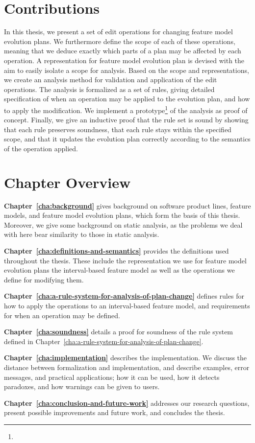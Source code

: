 \section{Contributions}

In this thesis, we present a set of edit operations for changing feature model evolution plans. We furthermore define the scope of each of these operations, meaning that we deduce exactly which parts of a plan may be affected by each operation. A representation for feature model evolution plan is devised with the aim to easily isolate a scope for analysis. Based on the scope and representations, we create an analysis method for validation and application of the edit operations. The analysis is formalized as a set of rules, giving detailed specification of when an operation may be applied to the evolution plan, and how to apply the modification. We implement a prototype\footnote{} of the analysis as proof of concept. Finally, we give an inductive proof that the rule set is sound by showing that each rule preserves soundness, that each rule stays within the specified scope, and that it updates the evolution plan correctly according to the semantics of the operation applied.

\section{Chapter Overview}
\label{sec:chapter-overview}

\textbf{Chapter~\ref{cha:background}} gives background on software product lines, feature models, and feature model evolution plans, which form the basis of this thesis. Moreover, we give some background on static analysis, as the problems we deal with here bear similarity to those in static analysis.

\textbf{Chapter~\ref{cha:definitions-and-semantics}} provides the definitions used throughout the thesis. These include the representation we use for feature model evolution plans \textemdash{} the interval-based feature model \textemdash{} as well as the operations we define for modifying them. 

\textbf{Chapter~\ref{cha:a-rule-system-for-analysis-of-plan-change}} defines rules for how to apply the operations to an interval-based feature model, and requirements for when an operation may be defined.

\textbf{Chapter~\ref{cha:soundness}} details a proof for soundness of the rule system defined in Chapter~\vref{cha:a-rule-system-for-analysis-of-plan-change}.

\textbf{Chapter~\ref{cha:implementation}} describes the implementation. We discuss the distance between formalization and implementation, and describe examples, error messages, and practical applications; how it can be used, how it detects paradoxes, and how warnings can be given to users.

\textbf{Chapter~\ref{cha:conclusion-and-future-work}} addresses our research questions, present possible improvements and future work, and concludes the thesis.
